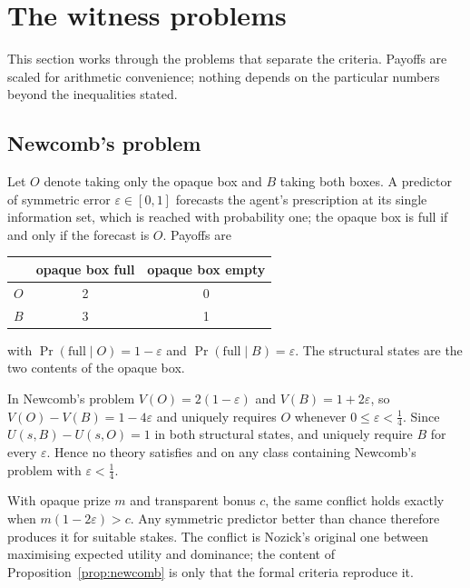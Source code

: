 \section{The witness problems}\label{sec:witnesses}

This section works through the problems that separate the criteria. Payoffs are scaled for
arithmetic convenience; nothing depends on the particular numbers beyond the inequalities stated.

\subsection{Newcomb's problem}\label{sec:newcomb}

Let $O$ denote taking only the opaque box and $B$ taking both boxes. A predictor of symmetric error
$\varepsilon\in[0,1]$ forecasts the agent's prescription at its single information set, which is
reached with probability one; the opaque box is full if and only if the forecast is $O$. Payoffs are

\begin{center}
\small
\begin{tabular}{@{}lcc@{}}
  \toprule
  & opaque box full & opaque box empty \\
  \midrule
  $O$ & 2 & 0 \\
  $B$ & 3 & 1 \\
  \bottomrule
\end{tabular}
\end{center}
with $\Pr(\text{full}\mid O)=1-\varepsilon$ and $\Pr(\text{full}\mid B)=\varepsilon$. The structural
states are the two contents of the opaque box.

\begin{proposition}\label{prop:newcomb}
In Newcomb's problem $V(O)=2(1-\varepsilon)$ and $V(B)=1+2\varepsilon$, so $V(O)-V(B)=1-4\varepsilon$
and  uniquely requires $O$ whenever $0\le\varepsilon<\tfrac14$. Since $U(s,B)-U(s,O)=1$ in both
structural states,  and  uniquely require $B$ for every $\varepsilon$. Hence no theory
satisfies  and  on any class containing Newcomb's problem with $\varepsilon<\tfrac14$.
\end{proposition}

With opaque prize $m$ and transparent bonus $c$, the same conflict holds exactly when
$m(1-2\varepsilon)>c$. Any symmetric predictor better than chance therefore produces it for suitable
stakes. The conflict is Nozick's original one between maximising expected utility and dominance;
the content of Proposition~\ref{prop:newcomb} is only that the formal criteria reproduce it.

